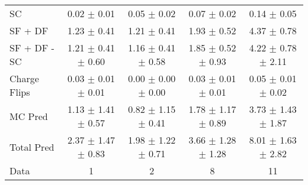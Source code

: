 \begin{tabular}{l|cccc}
                                 SC &  0.02 $\pm$  0.01 &  0.05 $\pm$  0.02 &  0.07 $\pm$  0.02 &  0.14 $\pm$  0.05 \\
                            SF + DF &  1.23 $\pm$  0.41 &  1.21 $\pm$  0.41 &  1.93 $\pm$  0.52 &  4.37 $\pm$  0.78 \\
\hline
                       SF + DF - SC &  1.21 $\pm$  0.41 $\pm$  0.60 &  1.16 $\pm$  0.41 $\pm$  0.58 &  1.85 $\pm$  0.52 $\pm$  0.93 &  4.22 $\pm$  0.78 $\pm$  2.11 \\
\hline\hline
                       Charge Flips &  0.03 $\pm$  0.01 $\pm$  0.01 &  0.00 $\pm$  0.00 $\pm$  0.00 &  0.03 $\pm$  0.01 $\pm$  0.01 &  0.05 $\pm$  0.01 $\pm$  0.02 \\
\hline
                            MC Pred &  1.13 $\pm$  1.41 $\pm$  0.57 &  0.82 $\pm$  1.15 $\pm$  0.41 &  1.78 $\pm$  1.17 $\pm$  0.89 &  3.73 $\pm$  1.43 $\pm$  1.87 \\
\hline
                         Total Pred &  2.37 $\pm$  1.47 $\pm$  0.83 &  1.98 $\pm$  1.22 $\pm$  0.71 &  3.66 $\pm$  1.28 $\pm$  1.28 &  8.01 $\pm$  1.63 $\pm$  2.82 \\
\hline\hline
                               Data &     1 &     2 &     8 &    11 \\
\hline\hline
\end{tabular}

